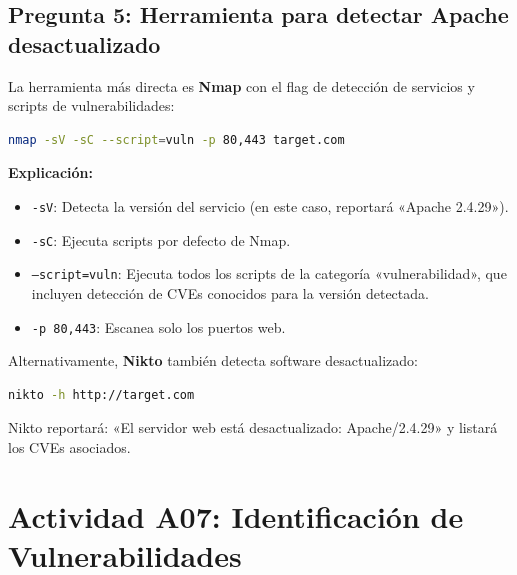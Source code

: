 \documentclass[11pt,a4paper]{article}
\begin{document}
\subsection*{Pregunta 5: Herramienta para detectar Apache desactualizado}
\begin{respuesta}
La herramienta más directa es \textbf{Nmap} con el flag de detección de servicios y scripts de vulnerabilidades:

\begin{lstlisting}[language=bash]
nmap -sV -sC --script=vuln -p 80,443 target.com
\end{lstlisting}

\textbf{Explicación:}
\begin{itemize}[leftmargin=*]
  \item \texttt{-sV}: Detecta la versión del servicio (en este caso, reportará «Apache 2.4.29»).
  \item \texttt{-sC}: Ejecuta scripts por defecto de Nmap.
  \item \texttt{--script=vuln}: Ejecuta todos los scripts de la categoría «vulnerabilidad», que incluyen detección de CVEs conocidos para la versión detectada.
  \item \texttt{-p 80,443}: Escanea solo los puertos web.
\end{itemize}

Alternativamente, \textbf{Nikto} también detecta software desactualizado:
\begin{lstlisting}[language=bash]
nikto -h http://target.com
\end{lstlisting}
Nikto reportará: «El servidor web está desactualizado: Apache/2.4.29» y listará los CVEs asociados.
\end{respuesta}

\section{Actividad A07: Identificación de Vulnerabilidades}
\end{document}
